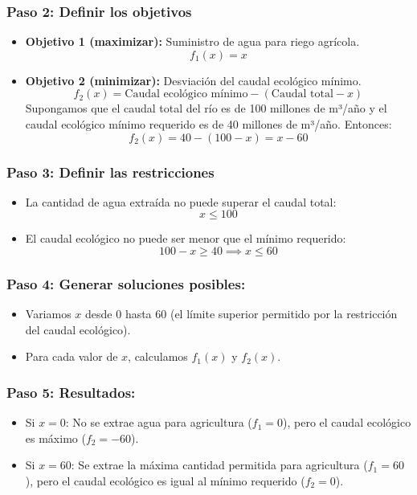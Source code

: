 \documentclass[12pt]{article}
\begin{document}
	\subsubsection*{Paso 2: Definir los objetivos}  
	\begin{itemize}
		\item \textbf{Objetivo 1 (maximizar):} Suministro de agua para riego agrícola.
		\[
		f_1(x) = x
		\]
		\item \textbf{Objetivo 2 (minimizar):} Desviación del caudal ecológico mínimo.
		\[
		f_2(x) = \text{Caudal ecológico mínimo} - (\text{Caudal total} - x)
		\]
		Supongamos que el caudal total del río es de 100 millones de m³/año y el caudal ecológico mínimo requerido es de 40 millones de m³/año. Entonces:
		\[
		f_2(x) = 40 - (100 - x) = x - 60
		\]
	\end{itemize}
	
	\subsubsection*{Paso 3: Definir las restricciones}  
	\begin{itemize}
		\item La cantidad de agua extraída no puede superar el caudal total:
		\[
		x \leq 100
		\]
		\item El caudal ecológico no puede ser menor que el mínimo requerido:
		\[
		100 - x \geq 40 \implies x \leq 60
		\]
	\end{itemize}
	
	
	\subsubsection*{Paso 4: Generar soluciones posibles:}
	\begin{itemize}
		\item Variamos \( x \) desde 0 hasta 60 (el límite superior permitido por la restricción del caudal ecológico).
		\item Para cada valor de \( x \), calculamos \( f_1(x) \) y \( f_2(x) \).
	\end{itemize}
	
	\subsubsection*{Paso 5: Resultados:}
	\begin{itemize}
		\item Si \( x = 0 \): No se extrae agua para agricultura (\( f_1 = 0 \)), pero el caudal ecológico es máximo (\( f_2 = -60 \)).
		\item Si \( x = 60 \): Se extrae la máxima cantidad permitida para agricultura (\( f_1 = 60 \)), pero el caudal ecológico es igual al mínimo requerido (\( f_2 = 0 \)).
	\end{itemize}
	
\end{document}
